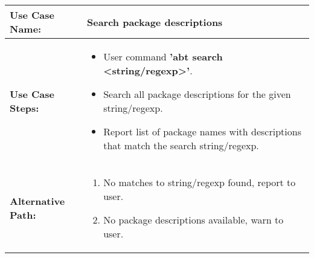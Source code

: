 \medskip

\begin{tabularx}{\linewidth}{|l|X|}
\hline
\textbf{Use Case Name:} & \textbf{Search package descriptions} \\
\hline
\textbf{Use Case Steps:} & 
\begin{minipage}{\linewidth} 
  \vspace{0.05em}
  \begin{itemize}
    \item User command \textbf{'abt search <string/regexp>'}.
    \item Search all package descriptions for the given string/regexp.
    \item Report list of package names with descriptions that match the search string/regexp.
  \end{itemize}
  \vspace{0.05em}
\end{minipage}
\\
\hline 
\textbf{Alternative Path:} &
\begin{minipage}{\linewidth}
  \vspace{0.05em} 
  \begin{enumerate}
    \item No matches to string/regexp found, report to user.
    \item No package descriptions available, warn to user.
  \end{enumerate}
  \vspace{0.05em} 
\end{minipage}
\\
\hline
\end{tabularx}